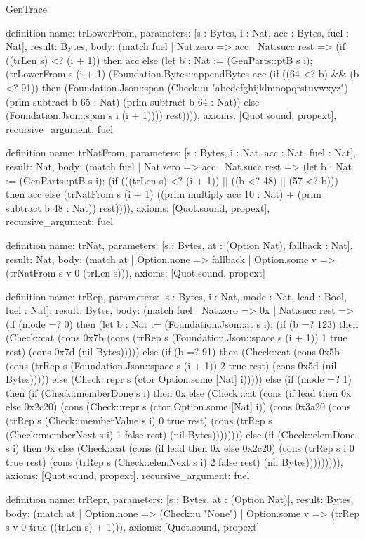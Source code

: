 \begin{lexlean}{GenTrace}
\begin{semanticmodule}
definition{
  name: trLowerFrom,
  parameters: [s : Bytes, i : Nat, acc : Bytes, fuel : Nat],
  result: Bytes,
  body: (match fuel
    | Nat.zero => acc
    | Nat.succ rest => (if ((trLen s) <? (i + 1)) then acc else (let b : Nat := (GenParts::ptB s i); (trLowerFrom s (i + 1) (Foundation.Bytes::appendBytes acc (if ((64 <? b) && (b <? 91)) then (Foundation.Json::span (Check::u "abcdefghijklmnopqrstuvwxyz") (prim subtract b 65 : Nat) (prim subtract b 64 : Nat)) else (Foundation.Json::span s i (i + 1)))) rest)))),
  axioms: [Quot.sound, propext],
  recursive_argument: fuel
}

definition{
  name: trNatFrom,
  parameters: [s : Bytes, i : Nat, acc : Nat, fuel : Nat],
  result: Nat,
  body: (match fuel
    | Nat.zero => acc
    | Nat.succ rest => (let b : Nat := (GenParts::ptB s i); (if (((trLen s) <? (i + 1)) || ((b <? 48) || (57 <? b))) then acc else (trNatFrom s (i + 1) ((prim multiply acc 10 : Nat) + (prim subtract b 48 : Nat)) rest)))),
  axioms: [Quot.sound, propext],
  recursive_argument: fuel
}

definition{
  name: trNat,
  parameters: [s : Bytes, at : (Option Nat), fallback : Nat],
  result: Nat,
  body: (match at | Option.none => fallback | Option.some v => (trNatFrom s v 0 (trLen s))),
  axioms: [Quot.sound, propext]
}

definition{
  name: trRep,
  parameters: [s : Bytes, i : Nat, mode : Nat, lead : Bool, fuel : Nat],
  result: Bytes,
  body: (match fuel
    | Nat.zero => 0x
    | Nat.succ rest => (if (mode =? 0) then (let b : Nat := (Foundation.Json::at s i); (if (b =? 123) then (Check::cat (cons 0x7b (cons (trRep s (Foundation.Json::space s (i + 1)) 1 true rest) (cons 0x7d (nil Bytes))))) else (if (b =? 91) then (Check::cat (cons 0x5b (cons (trRep s (Foundation.Json::space s (i + 1)) 2 true rest) (cons 0x5d (nil Bytes))))) else (Check::repr s (ctor Option.some [Nat] i))))) else (if (mode =? 1) then (if (Check::memberDone s i) then 0x else (Check::cat (cons (if lead then 0x else 0x2c20) (cons (Check::repr s (ctor Option.some [Nat] i)) (cons 0x3a20 (cons (trRep s (Check::memberValue s i) 0 true rest) (cons (trRep s (Check::memberNext s i) 1 false rest) (nil Bytes)))))))) else (if (Check::elemDone s i) then 0x else (Check::cat (cons (if lead then 0x else 0x2c20) (cons (trRep s i 0 true rest) (cons (trRep s (Check::elemNext s i) 2 false rest) (nil Bytes))))))))),
  axioms: [Quot.sound, propext],
  recursive_argument: fuel
}

definition{
  name: trRepr,
  parameters: [s : Bytes, at : (Option Nat)],
  result: Bytes,
  body: (match at
    | Option.none => (Check::u "None")
    | Option.some v => (trRep s v 0 true ((trLen s) + 1))),
  axioms: [Quot.sound, propext]
}


\end{semanticmodule}
\end{lexlean}

